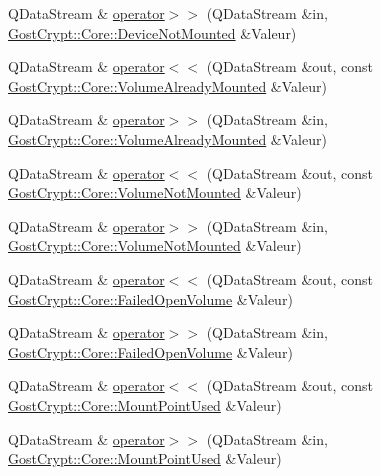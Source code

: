 \begin{DoxyCompactItemize}
Q\+Data\+Stream \& \hyperlink{namespace_gost_crypt_1_1_core_a29833970601c0471c393f36eaf6c51d8}{operator$>$$>$} (Q\+Data\+Stream \&in, \hyperlink{class_gost_crypt_1_1_core_1_1_device_not_mounted}{Gost\+Crypt\+::\+Core\+::\+Device\+Not\+Mounted} \&Valeur)
\item 
Q\+Data\+Stream \& \hyperlink{namespace_gost_crypt_1_1_core_a17203e9ea75c928df852cc42a0ae3dfb}{operator$<$$<$} (Q\+Data\+Stream \&out, const \hyperlink{class_gost_crypt_1_1_core_1_1_volume_already_mounted}{Gost\+Crypt\+::\+Core\+::\+Volume\+Already\+Mounted} \&Valeur)
\item 
Q\+Data\+Stream \& \hyperlink{namespace_gost_crypt_1_1_core_aa5bdaf36267419d7c241c0a0cf7b9ed0}{operator$>$$>$} (Q\+Data\+Stream \&in, \hyperlink{class_gost_crypt_1_1_core_1_1_volume_already_mounted}{Gost\+Crypt\+::\+Core\+::\+Volume\+Already\+Mounted} \&Valeur)
\item 
Q\+Data\+Stream \& \hyperlink{namespace_gost_crypt_1_1_core_aa824776b7aefccca76fb477059923da8}{operator$<$$<$} (Q\+Data\+Stream \&out, const \hyperlink{class_gost_crypt_1_1_core_1_1_volume_not_mounted}{Gost\+Crypt\+::\+Core\+::\+Volume\+Not\+Mounted} \&Valeur)
\item 
Q\+Data\+Stream \& \hyperlink{namespace_gost_crypt_1_1_core_a40fb37b07aef0ae9cdde50760e93e18f}{operator$>$$>$} (Q\+Data\+Stream \&in, \hyperlink{class_gost_crypt_1_1_core_1_1_volume_not_mounted}{Gost\+Crypt\+::\+Core\+::\+Volume\+Not\+Mounted} \&Valeur)
\item 
Q\+Data\+Stream \& \hyperlink{namespace_gost_crypt_1_1_core_a931125886c7d661d257b2fbcd7ba8b16}{operator$<$$<$} (Q\+Data\+Stream \&out, const \hyperlink{class_gost_crypt_1_1_core_1_1_failed_open_volume}{Gost\+Crypt\+::\+Core\+::\+Failed\+Open\+Volume} \&Valeur)
\item 
Q\+Data\+Stream \& \hyperlink{namespace_gost_crypt_1_1_core_a7c7d4ab2445884a3e33a34ca820ee164}{operator$>$$>$} (Q\+Data\+Stream \&in, \hyperlink{class_gost_crypt_1_1_core_1_1_failed_open_volume}{Gost\+Crypt\+::\+Core\+::\+Failed\+Open\+Volume} \&Valeur)
\item 
Q\+Data\+Stream \& \hyperlink{namespace_gost_crypt_1_1_core_af513974446b16d994fd3c684fa4a66ec}{operator$<$$<$} (Q\+Data\+Stream \&out, const \hyperlink{class_gost_crypt_1_1_core_1_1_mount_point_used}{Gost\+Crypt\+::\+Core\+::\+Mount\+Point\+Used} \&Valeur)
\item 
Q\+Data\+Stream \& \hyperlink{namespace_gost_crypt_1_1_core_abd500d2ef4921956c90431870261c90f}{operator$>$$>$} (Q\+Data\+Stream \&in, \hyperlink{class_gost_crypt_1_1_core_1_1_mount_point_used}{Gost\+Crypt\+::\+Core\+::\+Mount\+Point\+Used} \&Valeur)

\end{DoxyCompactItemize}
